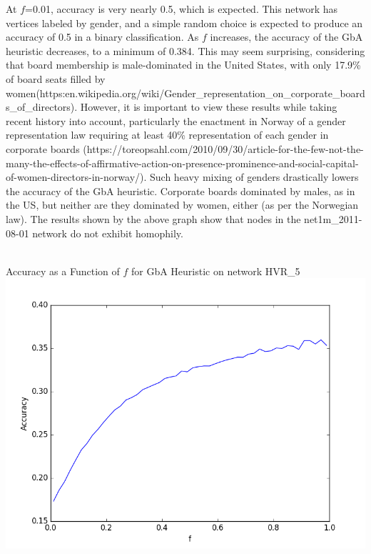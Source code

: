 \documentclass[11pt, oneside]{article}   	%
\begin{document}
\indent At $f$=0.01, accuracy is very nearly 0.5, which is expected.  This network has vertices labeled by gender, and a simple random choice is expected to produce an accuracy of 0.5 in a binary classification.  As $f$ increases, the accuracy of the GbA heuristic decreases, to a minimum of 0.384.  This may seem surprising, considering that board membership is male-dominated in the United States, with only 17.9\% of board seats filled by women(https:\/\/en.wikipedia.org/wiki/Gender\_representation\_on\_corporate\_boards\_of\_directors).  However, it is important to view these results while taking recent history into account, particularly the enactment in Norway of a gender representation law requiring at least 40\% representation of each gender in corporate boards (https://toreopsahl.com/2010/09/30/article-for-the-few-not-the-many-the-effects-of-affirmative-action-on-presence-prominence-and-social-capital-of-women-directors-in-norway/).  Such heavy mixing of genders drastically lowers the accuracy of the GbA heuristic.  Corporate boards dominated by males, as in the US, but neither are they dominated by women, either (as per the Norwegian law).  The results shown by the above graph show that nodes in the net1m\_2011-08-01 network do not exhibit homophily.\\\\
\begin{center} Accuracy as a Function of $f$ for GbA Heuristic on network HVR\_5 \includegraphics[scale=0.6]{HVR_51000Iterations.png}\end{center}
\end{document}
